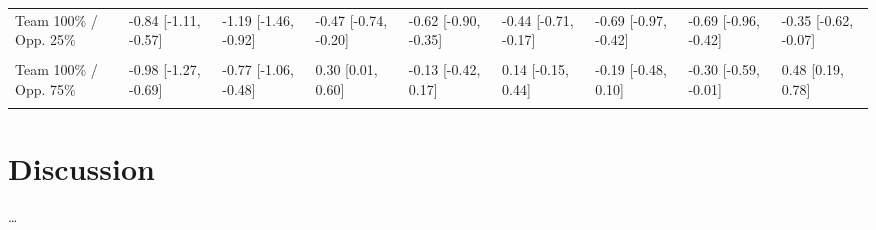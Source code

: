 \documentclass[]{elsarticle} %
\begin{document}
\begin{landscape}
\begin{table}
{\begin{tabular}[t]{lllllllll}
Team 100\% / Opp. 25\% & -0.84 [-1.11, -0.57] & -1.19 [-1.46, -0.92] & -0.47 [-0.74, -0.20] & -0.62 [-0.90, -0.35] & -0.44 [-0.71, -0.17] & -0.69 [-0.97, -0.42] & -0.69 [-0.96, -0.42] & -0.35 [-0.62, -0.07]\\
\cellcolor{gray!6}{Team 100\% / Opp. 50\%} & \cellcolor{gray!6}{-0.86 [-1.14, -0.58]} & \cellcolor{gray!6}{-0.92 [-1.20, -0.64]} & \cellcolor{gray!6}{-0.09 [-0.38, 0.20]} & \cellcolor{gray!6}{-0.34 [-0.63, -0.05]} & \cellcolor{gray!6}{-0.12 [-0.41, 0.17]} & \cellcolor{gray!6}{-0.45 [-0.74, -0.16]} & \cellcolor{gray!6}{-0.50 [-0.78, -0.21]} & \cellcolor{gray!6}{0.08 [-0.21, 0.38]}\\
Team 100\% / Opp. 75\% & -0.98 [-1.27, -0.69] & -0.77 [-1.06, -0.48] & 0.30 [0.01, 0.60] & -0.13 [-0.42, 0.17] & 0.14 [-0.15, 0.44] & -0.19 [-0.48, 0.10] & -0.30 [-0.59, -0.01] & 0.48 [0.19, 0.78]\\
\cellcolor{gray!6}{Team 100\% / Opp. 100\%} & \cellcolor{gray!6}{-1.11 [-1.41, -0.81]} & \cellcolor{gray!6}{-0.62 [-0.92, -0.32]} & \cellcolor{gray!6}{0.69 [0.38, 1.00]} & \cellcolor{gray!6}{0.12 [-0.19, 0.43]} & \cellcolor{gray!6}{0.41 [0.10, 0.72]} & \cellcolor{gray!6}{0.00 [-0.30, 0.31]} & \cellcolor{gray!6}{-0.25 [-0.55, 0.06]} & \cellcolor{gray!6}{0.75 [0.44, 1.07]}\\
\bottomrule
\end{tabular}}
\end{table}
\end{landscape}

\hypertarget{discussion}{%
\section{Discussion}\label{discussion}}

\ldots{}
\end{document}
